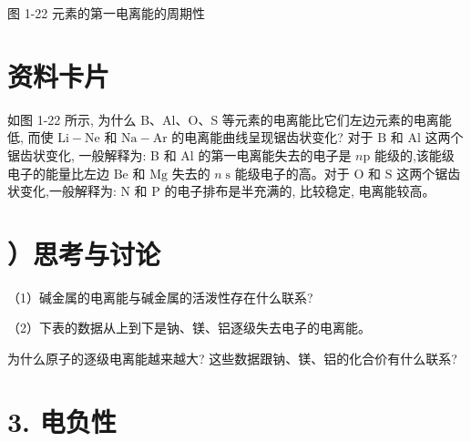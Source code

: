 \documentclass[10pt]{article}
\begin{document}
图 1-22 元素的第一电离能的周期性

\section*{资料卡片}

如图 1-22 所示, 为什么 B、Al、O、S 等元素的电离能比它们左边元素的电离能低, 而使 \(\mathrm{{Li}} - \mathrm{{Ne}}\) 和 \(\mathrm{{Na}} - \mathrm{{Ar}}\) 的电离能曲线呈现锯齿状变化? 对于 \(\mathrm{B}\) 和 \(\mathrm{{Al}}\) 这两个锯齿状变化, 一般解释为: B 和 \(\mathrm{{Al}}\) 的第一电离能失去的电子是 \(n\mathrm{p}\) 能级的,该能级电子的能量比左边 \(\mathrm{{Be}}\) 和 \(\mathrm{{Mg}}\) 失去的 \(n\mathrm{\;s}\) 能级电子的高。对于 \(\mathrm{O}\) 和 \(\mathrm{S}\) 这两个锯齿状变化,一般解释为: \(\mathrm{N}\) 和 \(\mathrm{P}\) 的电子排布是半充满的, 比较稳定, 电离能较高。

\section*{）思考与讨论}

（1）碱金属的电离能与碱金属的活泼性存在什么联系?

（2）下表的数据从上到下是钠、镁、铝逐级失去电子的电离能。

\begin{center}
\end{center}

为什么原子的逐级电离能越来越大? 这些数据跟钠、镁、铝的化合价有什么联系?

\section*{3. 电负性}
\end{document}
